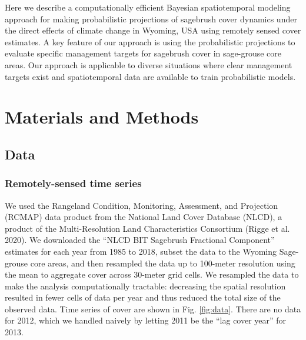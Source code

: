 \documentclass[
  12pt,
]{article}
\begin{document}
Here we describe a computationally efficient Bayesian spatiotemporal modeling approach for making probabilistic projections of sagebrush cover dynamics under the direct effects of climate change in Wyoming, USA using remotely sensed cover estimates.
A key feature of our approach is using the probabilistic projections to evaluate specific management targets for sagebrush cover in sage-grouse core areas.
Our approach is applicable to diverse situations where clear management targets exist and spatiotemporal data are available to train probabilistic models.

\hypertarget{materials-and-methods}{%
\section{Materials and Methods}\label{materials-and-methods}}

\hypertarget{data}{%
\subsection{Data}\label{data}}

\hypertarget{remotely-sensed-time-series}{%
\subsubsection{Remotely-sensed time series}\label{remotely-sensed-time-series}}

We used the Rangeland Condition, Monitoring, Assessment, and Projection (RCMAP) data product from the National Land Cover Database (NLCD), a product of the Multi-Resolution Land Characteristics Consortium (Rigge et al. 2020).
We downloaded the ``NLCD BIT Sagebrush Fractional Component'' estimates for each year from 1985 to 2018, subset the data to the Wyoming Sage-grouse core areas, and then resampled the data up to 100-meter resolution using the mean to aggregate cover across 30-meter grid cells.
We resampled the data to make the analysis computationally tractable: decreasing the spatial resolution resulted in fewer cells of data per year and thus reduced the total size of the observed data.
Time series of cover are shown in Fig. \ref{fig:data}.
There are no data for 2012, which we handled naively by letting 2011 be the ``lag cover year'' for 2013.
\end{document}
